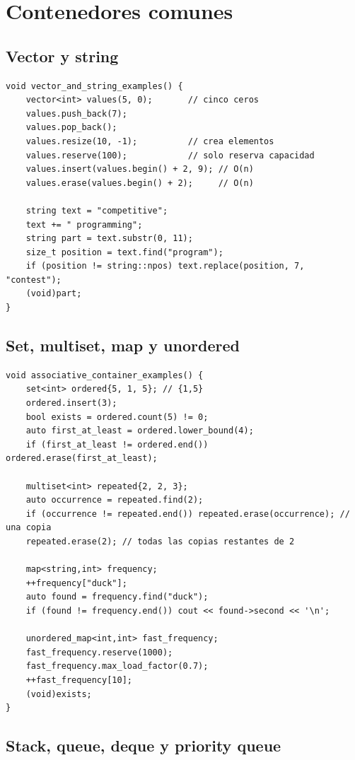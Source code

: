 \section{Contenedores comunes}

\subsection{Vector y string}

\begin{lstlisting}[style=cpp]
void vector_and_string_examples() {
    vector<int> values(5, 0);       // cinco ceros
    values.push_back(7);
    values.pop_back();
    values.resize(10, -1);          // crea elementos
    values.reserve(100);            // solo reserva capacidad
    values.insert(values.begin() + 2, 9); // O(n)
    values.erase(values.begin() + 2);     // O(n)

    string text = "competitive";
    text += " programming";
    string part = text.substr(0, 11);
    size_t position = text.find("program");
    if (position != string::npos) text.replace(position, 7, "contest");
    (void)part;
}
\end{lstlisting}

\subsection{Set, multiset, map y unordered}

\begin{lstlisting}[style=cpp]
void associative_container_examples() {
    set<int> ordered{5, 1, 5}; // {1,5}
    ordered.insert(3);
    bool exists = ordered.count(5) != 0;
    auto first_at_least = ordered.lower_bound(4);
    if (first_at_least != ordered.end()) ordered.erase(first_at_least);

    multiset<int> repeated{2, 2, 3};
    auto occurrence = repeated.find(2);
    if (occurrence != repeated.end()) repeated.erase(occurrence); // una copia
    repeated.erase(2); // todas las copias restantes de 2

    map<string,int> frequency;
    ++frequency["duck"];
    auto found = frequency.find("duck");
    if (found != frequency.end()) cout << found->second << '\n';

    unordered_map<int,int> fast_frequency;
    fast_frequency.reserve(1000);
    fast_frequency.max_load_factor(0.7);
    ++fast_frequency[10];
    (void)exists;
}
\end{lstlisting}

\subsection{Stack, queue, deque y priority queue}

